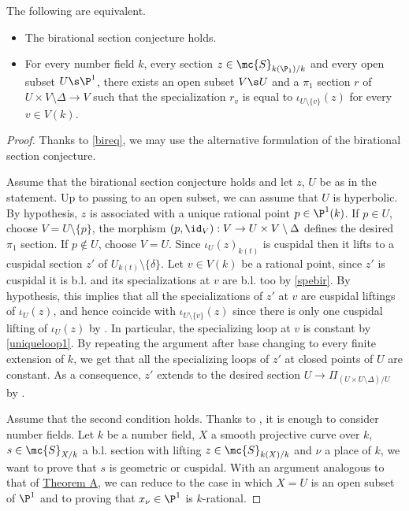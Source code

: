 \begin{TC}
\notready
	The following are equivalent.
	\begin{itemize}
		\item The birational section conjecture holds.
		\item For every number field $k$, every section $z\in\mc{S}_{k(\P_{1})/k}$ and every open subset $U\s\P^{1}$, there exists an open subset $V\s U$ and a $\pi_{1}$ section $r$ of $U\times V\setminus\Delta \to V$ such that the specialization $r_{v}$ is equal to $\iota_{U\setminus\{v\}}(z)$ for every $v\in V(k)$.
	\end{itemize}
	\begin{proof}
            Thanks to \autoref{bireq}, we may use the alternative formulation of the birational section conjecture.

		Assume that the birational section conjecture holds and let $z$, $U$ be as in the statement. Up to passing to an open subset, we can assume that $U$ is hyperbolic. By hypothesis, $z$ is associated with a unique rational point $p\in\P^{1}(k)$. If $p\in U$, choose $V=U\setminus\{p\}$, the morphism $(p,\id_{V}):V\to U\times V\setminus\Delta$ defines the desired $\pi_{1}$ section. If $p\not \in U$, choose $V=U$. Since $\iota_{U}(z)_{k(t)}$ is cuspidal then it lifts to a cuspidal section $z'$ of $U_{k(t)}\setminus\{\delta\}$. Let $v\in V(k)$ be a rational point, since $z'$ is cuspidal it is b.l. and its specializations at $v$ are b.l. too by \autoref{spebir}. By hypothesis, this implies that all the specializations of $z'$ at $v$ are cuspidal liftings of $\iota_{U}(z)$, and hence coincide with $\iota_{U\setminus\{v\}}(z)$ since there is only one cuspidal lifting of $\iota_{U}(z)$ by \cite[Theorem 17 (2)]{sti12}. In particular, the specializing loop at $v$ is constant by \autoref{uniqueloop1}. By repeating the argument after base changing to every finite extension of $k$, we get that all the specializing loops of $z'$ at closed points of $U$ are constant. As a consequence, $z'$ extends to the desired section $U\to\Pi_{(U\times U\setminus\Delta)/U}$ by \cite[Corollary A.3]{fed}.

            Assume that the second condition holds. Thanks to \cite[Theorem C]{saty21}, it is enough to consider number fields. Let $k$ be a number field, $X$ a smooth projective curve over $k$, $s\in\mc{S}_{X/k}$ a b.l. section with lifting $z\in\mc{S}_{k(X)/k}$ and $\nu$ a place of $k$, we want to prove that $s$ is geometric or cuspidal. With an argument analogous to that of \hyperlink{TA}{Theorem A}, we can reduce to the case in which $X=U$ is an open subset of $\P^{1}$ and to proving that $x_{\nu}\in\P^{1}$ is $k$-rational.


\end{proof}
\end{TC}
